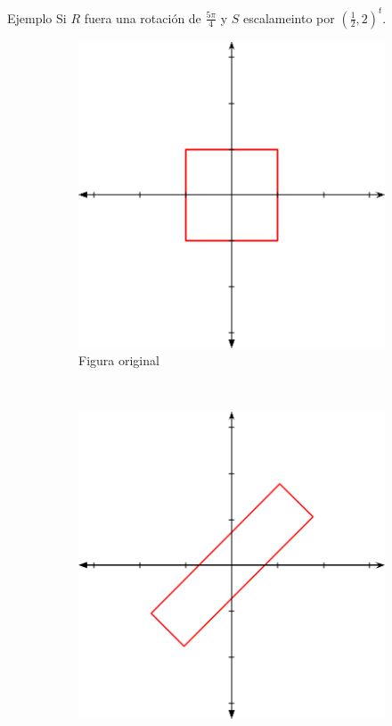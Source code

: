 \begin{frame}{Ejemplo}
Si $R$ fuera una rotación de $\frac{5\pi}{4}$ y $S$ escalameinto por $(\frac{1}{2}, 2)^t$.
\begin{figure}[htp]
 \centering
 \begin{subfigure}[b]{0.25\textwidth}
   \includegraphics[width=\textwidth]{img/Square}
   \caption{Figura original}
 \end{subfigure}
 ~
 \begin{subfigure}[b]{0.25\textwidth}
   \includegraphics[width=\textwidth]{img/ScaleRoate}

\end{subfigure}
\end{figure}
\end{frame}
